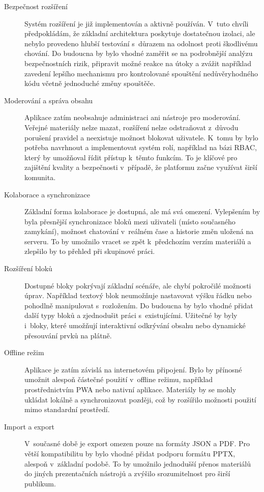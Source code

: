 \begin{description}
  \item[Bezpečnost rozšíření] Systém rozšíření je již implementován a aktivně používán. 
  V~tuto chvíli předpokládám, že základní architektura poskytuje dostatečnou izolaci, ale nebylo provedeno hlubší testování s~důrazem na odolnost proti škodlivému chování. 
  Do budoucna by bylo vhodné zaměřit se na podrobnější analýzu bezpečnostních rizik, připravit možné reakce na útoky a zvážit například zavedení lepšího mechanismu pro kontrolované spouštění nedůvěryhodného kódu včetně jednoduché změny spouštěče.

  \item[Moderování a správa obsahu] Aplikace zatím neobsahuje administraci ani nástroje pro moderování. 
  Veřejné materiály nelze mazat, rozšíření nelze odstraňovat z~důvodu porušení pravidel a neexistuje možnost blokovat uživatele. 
  K~tomu by bylo potřeba navrhnout a implementovat systém rolí, například na bázi RBAC, který by umožňoval řídit přístup k~těmto funkcím. To je klíčové pro zajištění kvality a bezpečnosti v~případě, že platformu začne využívat širší komunita.

  \item[Kolaborace a synchronizace] Základní forma kolaborace je dostupná, ale má svá omezení.
  Vylepšením by byla přesnější synchronizace bloků mezi uživateli (místo současného zamykání), možnost chatování v~reálném čase a historie změn uložená na serveru. 
  To by umožnilo vracet se zpět k~předchozím verzím materiálů a zlepšilo by to přehled při skupinové práci.

  \item[Rozšíření bloků] Dostupné bloky pokrývají základní scénáře, ale chybí pokročilé možnosti úprav. 
  Například textový blok neumožňuje nastavovat výšku řádku nebo pohodlně manipulovat s~rozložením. 
  Do budoucna by bylo vhodné přidat další typy bloků a zjednodušit práci s~existujícími.
  Užitečné by byly i~bloky, které umožňují interaktivní odkrývání obsahu nebo dynamické přesouvání prvků na plátně.

  \item[Offline režim] Aplikace je zatím závislá na internetovém připojení. 
  Bylo by přínosné umožnit alespoň částečné použití v~offline režimu, například prostřednictvím PWA nebo nativní aplikace. 
  Materiály by se mohly ukládat lokálně a synchronizovat později, což by rozšířilo možnosti použití mimo standardní prostředí.

  \item[Import a export] V~současné době je export omezen pouze na formáty JSON a PDF. 
  Pro větší kompatibilitu by bylo vhodné přidat podporu formátu PPTX, alespoň v~základní podobě. 
  To by umožnilo jednodušší přenos materiálů do jiných prezentačních nástrojů a zvýšilo srozumitelnost pro širší publikum.


\end{description}
